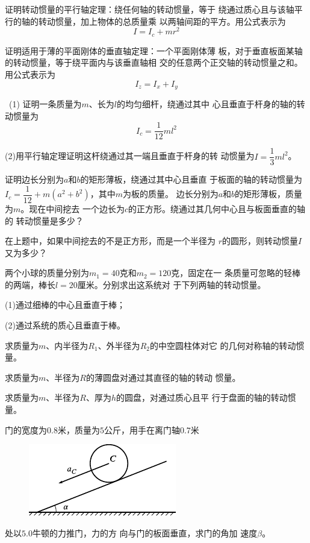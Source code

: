 \begin{exercises}

\exercise 证明转动惯量的平行轴定理：绕任何轴的转动惯量，等于
绕通过质心且与该轴平行的轴的转动惯量，加上物体的总质量乘
以两轴间距的平方。用公式表示为
\begin{equation*}
    I = I _ { c } + m r ^ { 2 }
\end{equation*}

\exercise 证明适用于薄的平面刚体的垂直轴定理：一个平面刚体薄
板，对于垂直板面某轴的转动惯量，等于绕平面内与该垂直轴相
交的任意两个正交轴的转动惯量之和。用公式表示为
\begin{equation*}
    I _ { z } = I _ { x } + I _ { y }
\end{equation*}

\exercise ~(1) 证明一条质量为$ m $、长为$ l $的均匀细杆，绕通过其中
心且垂直于杆身的轴的转动惯量为
\begin{equation*}
    I _ { c } = \frac { 1 } { 1 2 } m l ^ { 2 }
\end{equation*}

(2)用平行轴定理证明这杆绕通过其一端且垂直于杆身的转
动惯量为$  I = \dfrac { 1 } { 3 } m l ^ { 2 }  $。

\exercise 证明边长分别为$ a $和$ b $的矩形薄板，绕通过其中心且垂直
于板面的轴的转动惯量为$ I _ { c } = \dfrac { 1 } { 1 2 } + m \left( a ^ { 2 } + b ^ { 2 } \right)  $，其中$ m $为板的质量。
\clearpage
\exercise 边长分别为$ a $和$ b $的矩形薄板，质量为$ m $。现在中间挖去
一个边长为$ c $的正方形。绕通过其几何中心且与板面垂直的轴的
转动惯量是多少？

\exercise 在上题中，如果中间挖去的不是正方形，而是一个半径为
$ r $的圆形，则转动惯量$ I $又为多少？

\exercise 两个小球的质量分别为$  m _ { 1 } = 4 0   $克和$  m _ { 2 } = 1 2 0   $克，固定在一
条质量可忽略的轻棒的两端，棒长$  l = 2 0   $厘米。分别求出这系统对
于下列两轴的转动惯量。

(1)通过细棒的中心且垂直于棒；

(2)通过系统的质心且垂直于棒。

\exercise 求质量为$ m $、内半径为$ R_1 $、外半径为$ R_2 $的中空圆柱体对它
的几何对称轴的转动惯量。

\exercise 求质量为$ m $、半径为$ R $的薄圆盘对通过其直径的轴的转动
惯量。

\exercise 求质量为$ m $、半径为$ R $、厚为$ h $的圆盘，对通过质心且平
行于盘面的轴的转动惯量。

\exercise 门的宽度为$ 0.8 $米，质量为$ 5 $公斤，用手在离门轴$ 0.7 $米
\begin{figure}
    \centering
    \includegraphics{figure/fig10.25}
    \caption{}
    \label{fig:10.25}
\end{figure}
处以$ 5.0 $牛顿的力推门，力的方
向与门的板面垂直，求门的角加
速度$ \beta $。


\end{exercises}

